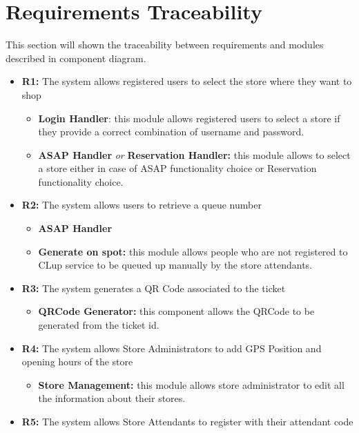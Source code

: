 \documentclass[table, 12pt]{article}
\begin{document}
\section{Requirements Traceability}
This section will shown the traceability between requirements and modules described in component diagram.

\begin{itemize}
    \item \textbf{R1:} The system allows registered users to select the store where they want to shop
          \begin{itemize}
              \item \textbf{Login Handler}: this module allows registered users to select a store if they provide a correct combination of username and password.
              \item \textbf{ASAP Handler} \textit{or} \textbf{Reservation Handler:} this module allows to select a store either in case of ASAP functionality choice or Reservation functionality choice.
          \end{itemize}
    \item \textbf{R2:} The system allows users to retrieve a queue number
          \begin{itemize}
              \item \textbf{ASAP Handler}
              \item \textbf{Generate on spot:} this module allows people who are not registered to CLup service to be queued up manually by the store attendants.
          \end{itemize}
    \item \textbf{R3:} The system generates a QR Code associated to the ticket
          \begin{itemize}
              \item \textbf{QRCode Generator:} this component allows the QRCode to be generated from the ticket id.
          \end{itemize}
    \item \textbf{R4:} The system allows Store Administrators to add GPS Position and opening hours of the store
          \begin{itemize}
              \item \textbf{Store Management:} this module allows store administrator to edit all the information about their stores.
          \end{itemize}
    \item \textbf{R5:} The system allows Store Attendants to register with their attendant code

\end{itemize}
\end{document}
